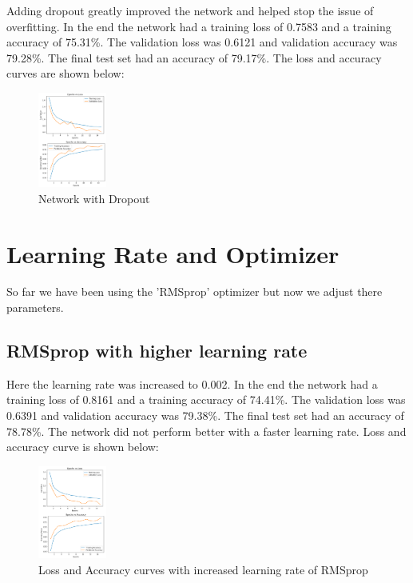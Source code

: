 \documentclass[conference]{IEEEtran}
\begin{document}
    Adding dropout greatly improved the network and helped stop the issue of overfitting. In the end the network had a training loss of
    0.7583 and a training accuracy of 75.31\%. The validation loss was 0.6121 and validation accuracy was 79.28\%. The final test set had
    an accuracy of 79.17\%. The loss and accuracy curves are shown below:

    \begin{figure}[H]
        \centering
        \captionsetup{justification=centering}
        \centering
            \includegraphics[width=0.2\textwidth]{13.png}
            \caption{Network with Dropout}
    \end{figure}

    \section{Learning Rate and Optimizer}

    So far we have been using the 'RMSprop' optimizer but now we adjust there parameters.

    \subsection{RMSprop with higher learning rate}

    Here the learning rate was increased to 0.002.  In the end the network had a training loss of
    0.8161 and a training accuracy of 74.41\%. The validation loss was 0.6391 and validation accuracy was 79.38\%. The final test set had
    an accuracy of 78.78\%. The network did not perform better with a faster learning rate. Loss and accuracy curve is shown below:

    \begin{figure}[H]
        \centering
        \captionsetup{justification=centering}
        \centering
            \includegraphics[width=0.2\textwidth]{14.png}
            \caption{Loss and Accuracy curves with increased learning rate of RMSprop}
    \end{figure}
\end{document}
